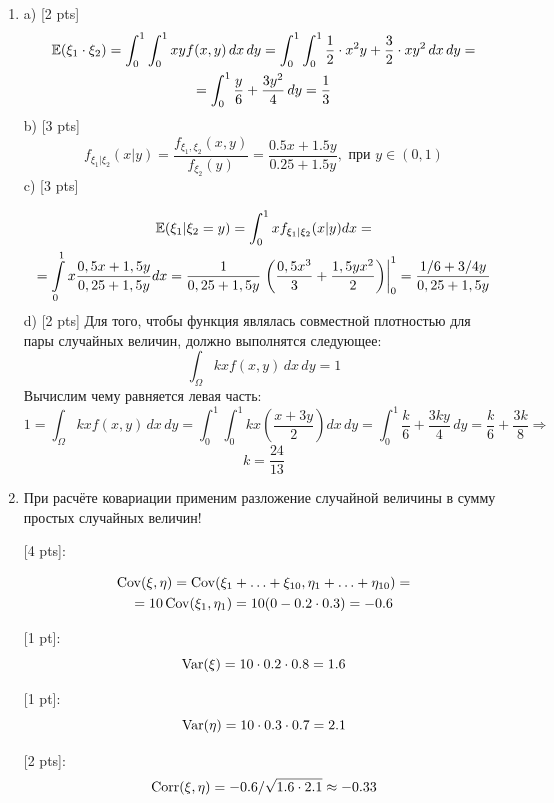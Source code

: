 \documentclass[12pt, a4paper]{article}\usepackage[]{graphicx}\usepackage[]{color}
\begin{document}
				\begin{enumerate}

					\item
					a) [2 pts]
					\begin{multline}
					\mathbb{E}({\xi_1 \cdot \xi_2}) = \int_{0}^1 \int_0^1 xy f(x,y) \, dx \, dy = \int_0^1 \int_0^1 \frac{1}{2}\cdot x^2y + \frac{3}{2}\cdot xy^2 \, dx \, dy =\\
					=  \int_{0}^1 \frac{y}{6} + \frac{3y^2}{4} \,dy = \frac{1}{3}
					\nonumber\end{multline}
					b) [3 pts]
					\[
					f_{\xi_1 | \xi_2} (x | y) = \frac{f_{\xi_1, \xi_2}(x, y)}{f_{\xi_2}(y)} = \frac{0.5x + 1.5y}{0.25 + 1.5y}, \text{ при } y \in (0,1)
					\]
					c) [3 pts]

					\begin{multline}
					\mathbb{E}(\xi_1 | \xi_2 = y) = \int_0^1 x f_{\xi_1 | \xi_2} (x | y) dx = \\
					= \int\limits_{0}^{1}  x \dfrac{0,5x + 1,5y}{0,25 + 1,5y} dx = \dfrac{1}{0,25 + 1,5y}  \left. \left( \dfrac{0,5x^3}{3} +  \dfrac{1,5yx^2}{2} \right) \right|_0^1  =  \dfrac{1/6 + 3/4y}{0,25 + 1,5y}
					\end{multline}
					d) [2 pts]
					Для того, чтобы функция являлась совместной плотностью для пары случайных величин, должно выполнятся следующее:
					\[
					\int_{\Omega} kx f(x,y) \, dx \, dy = 1
					\]
					Вычислим чему равняется левая часть:
					\[
					1 = \int_{\Omega} kx f(x,y) \, dx \, dy = \int_{0}^1 \int_{0}^1 kx \left(\frac{x + 3y}{2}\right) dx \, dy = \int_{0}^1 \frac{k}{6} + \frac{3ky}{4} \, dy = \frac{k}{6} + \frac{3k}{8} \Rightarrow
					\]
					\[
					k = \frac{24}{13}
					\]
					\item При расчёте ковариации применим разложение случайной величины в сумму простых случайных величин!

					[4 pts]:

					\begin{multline}
					\operatorname{Cov}(\xi, \eta) = \operatorname{Cov}(\xi_1 + \ldots + \xi_{10}, \eta_1 + \ldots + \eta_{10})=\\
					=10\operatorname{Cov}(\xi_1, \eta_1)=10(0-0.2\cdot 0.3)=-0.6
					\nonumber\end{multline}



					[1 pt]:
					\[
					\operatorname{Var}(\xi)=10\cdot 0.2\cdot 0.8=1.6
					\]

					[1 pt]:
					\[
					\operatorname{Var}(\eta)=10\cdot 0.3\cdot 0.7=2.1
					\]

					[2 pts]:
					\[
					\operatorname{Corr}(\xi,\eta)=-0.6/\sqrt{1.6\cdot 2.1} \approx -0.33
					\]


\end{enumerate}
\end{document}
